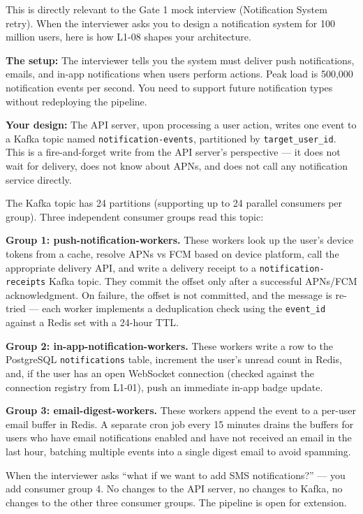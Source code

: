 \documentclass[11pt,a4paper]{article}
\begin{document}
This is directly relevant to the Gate 1 mock interview (Notification System retry). When the interviewer asks you to design a notification system for 100 million users, here is how L1-08 shapes your architecture.

\textbf{The setup:} The interviewer tells you the system must deliver push notifications, emails, and in-app notifications when users perform actions. Peak load is 500,000 notification events per second. You need to support future notification types without redeploying the pipeline.

\textbf{Your design:} The API server, upon processing a user action, writes one event to a Kafka topic named \texttt{notification-events}, partitioned by \texttt{target\_user\_id}. This is a fire-and-forget write from the API server's perspective --- it does not wait for delivery, does not know about APNs, and does not call any notification service directly.

The Kafka topic has 24 partitions (supporting up to 24 parallel consumers per group). Three independent consumer groups read this topic:

\textbf{Group 1: push-notification-workers.} These workers look up the user's device tokens from a cache, resolve APNs vs FCM based on device platform, call the appropriate delivery API, and write a delivery receipt to a \texttt{notification-receipts} Kafka topic. They commit the offset only after a successful APNs/FCM acknowledgment. On failure, the offset is not committed, and the message is re-tried --- each worker implements a deduplication check using the \texttt{event\_id} against a Redis set with a 24-hour TTL.

\textbf{Group 2: in-app-notification-workers.} These workers write a row to the PostgreSQL \texttt{notifications} table, increment the user's unread count in Redis, and, if the user has an open WebSocket connection (checked against the connection registry from L1-01), push an immediate in-app badge update.

\textbf{Group 3: email-digest-workers.} These workers append the event to a per-user email buffer in Redis. A separate cron job every 15 minutes drains the buffers for users who have email notifications enabled and have not received an email in the last hour, batching multiple events into a single digest email to avoid spamming.

When the interviewer asks ``what if we want to add SMS notifications?'' --- you add consumer group 4. No changes to the API server, no changes to Kafka, no changes to the other three consumer groups. The pipeline is open for extension.
\end{document}
